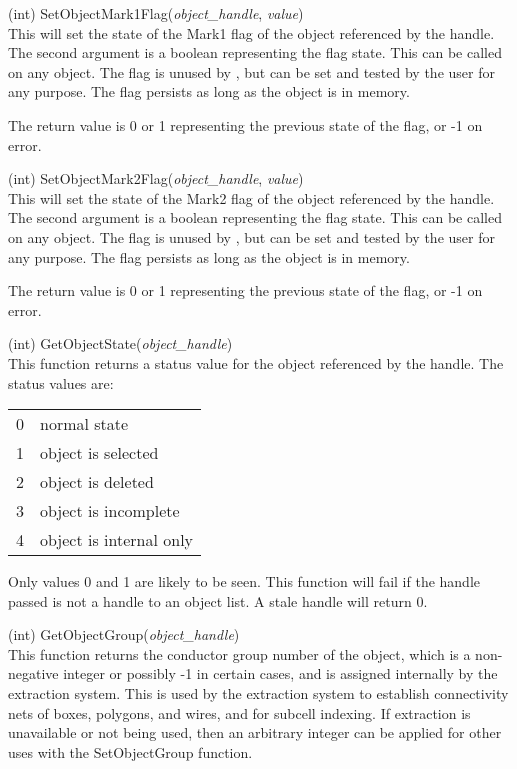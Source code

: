 \begin{description}
\item{(int) \vt SetObjectMark1Flag({\it object\_handle\/}, {\it value\/})}\\
This will set the state of the {\vt Mark1} flag of the object
referenced by the handle.  The second argument is a boolean
representing the flag state.  This can be called on any object.  The
flag is unused by {\Xic}, but can be set and tested by the user for
any purpose.  The flag persists as long as the object is in memory.

The return value is 0 or 1 representing the previous state of the
flag, or -1 on error.

\item{(int) \vt SetObjectMark2Flag({\it object\_handle\/}, {\it value\/})}\\

This will set the state of the {\vt Mark2} flag of the object
referenced by the handle.  The second argument is a boolean
representing the flag state.  This can be called on any object.  The
flag is unused by {\Xic}, but can be set and tested by the user for
any purpose.  The flag persists as long as the object is in memory.

The return value is 0 or 1 representing the previous state of the
flag, or -1 on error.

\item{(int) \vt GetObjectState({\it object\_handle\/})}\\
This function returns a status value for the object referenced by the
handle.  The status values are:

\begin{tabular}{ll}\\
0 & normal state\\
1 & object is selected\\
2 & object is deleted\\
3 & object is incomplete\\
4 & object is internal only\\
\end{tabular}

Only values 0 and 1 are likely to be seen.  This function will fail if
the handle passed is not a handle to an object list.  A stale handle
will return 0.

\item{(int) \vt GetObjectGroup({\it object\_handle\/})}\\
This function returns the conductor group number of the object, which
is a non-negative integer or possibly -1 in certain cases, and is
assigned internally by the extraction system.  This is used by the
extraction system to establish connectivity nets of boxes, polygons,
and wires, and for subcell indexing.  If extraction is unavailable or
not being used, then an arbitrary integer can be applied for other
uses with the {\vt SetObjectGroup} function.


\end{description}
